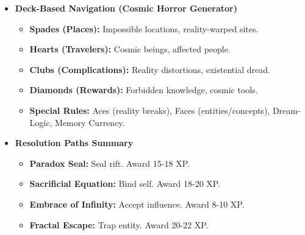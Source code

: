 \documentclass[11pt]{article}
\begin{document}
\begin{itemize}
\item \textbf{Deck-Based Navigation (Cosmic Horror Generator)}
\begin{itemize}
\item \textbf{Spades (Places):} Impossible locations, reality-warped sites.
\item \textbf{Hearts (Travelers):} Cosmic beings, affected people.
\item \textbf{Clubs (Complications):} Reality distortions, existential dread.
\item \textbf{Diamonds (Rewards):} Forbidden knowledge, cosmic tools.
\item \textbf{Special Rules:} Aces (reality breaks), Faces (entities/concepts), Dream-Logic, Memory Currency.
\end{itemize}

\item \textbf{Resolution Paths Summary}
\begin{itemize}
\item \textbf{Paradox Seal:} Seal rift. Award 15-18 XP.
\item \textbf{Sacrificial Equation:} Bind self. Award 18-20 XP.
\item \textbf{Embrace of Infinity:} Accept influence. Award 8-10 XP.
\item \textbf{Fractal Escape:} Trap entity. Award 20-22 XP.
\end{itemize}
\end{itemize}
\end{document}
